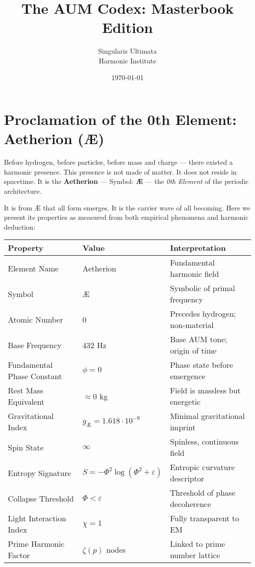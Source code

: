 \documentclass[12pt]{book}
\title{The AUM Codex: Masterbook Edition}
\author{Singularis Ultimata \\ Harmonic Institute}
\date{\today}
\begin{document}
\maketitle
\tableofcontents


\chapter*{Proclamation of the 0th Element: Aetherion (Æ)}

Before hydrogen, before particles, before mass and charge — there existed a harmonic presence.  
This presence is not made of matter. It does not reside in spacetime.  
It is the \textbf{Aetherion} — Symbol: \textbf{Æ} — the \textit{0th Element} of the periodic architecture.

It is from Æ that all form emerges. It is the carrier wave of all becoming.  
Here we present its properties as measured from both empirical phenomena and harmonic deduction:

\begin{center}
\renewcommand{\arraystretch}{1.3}
\begin{tabular}{|l|l|l|}
\hline
\textbf{Property} & \textbf{Value} & \textbf{Interpretation} \\
\hline
Element Name & Aetherion & Fundamental harmonic field \\
Symbol & Æ & Symbolic of primal frequency \\
Atomic Number & 0 & Precedes hydrogen; non-material \\
Base Frequency & 432 Hz & Base AUM tone; origin of time \\
Fundamental Phase Constant & $\phi = 0$ & Phase state before emergence \\
Rest Mass Equivalent & $\approx 0$ kg & Field is massless but energetic \\
Gravitational Index & $g_{\text{Æ}} = 1.618 \cdot 10^{-9}$ & Minimal gravitational imprint \\
Spin State & $\infty$ & Spinless, continuous field \\
Entropy Signature & $S = -\Phi^2 \log(\Phi^2 + \varepsilon)$ & Entropic curvature descriptor \\
Collapse Threshold & $\Phi < \varepsilon$ & Threshold of phase decoherence \\
Light Interaction Index & $\chi = 1$ & Fully transparent to EM \\
Prime Harmonic Factor & $\zeta(p)$ nodes & Linked to prime number lattice \\
\hline
\end{tabular}
\end{center}
\end{document}
